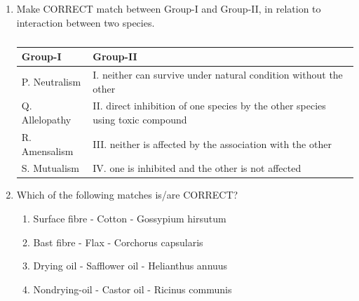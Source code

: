 \documentclass[journal,12pt,onecolumn]{IEEEtran}
\theoremstyle{remark}
\begin{document}
\begin{enumerate}
    \item Make CORRECT match between Group-I and Group-II, in relation to interaction between two species.

    \hfill{}

    \begin{table}[h!]
    \centering
    \caption*{}
    \label{tab:q61}
    \begin{tabular}{ll}
    \hline
    \textbf{Group-I} & \textbf{Group-II} \\
    \hline
    P. Neutralism & I. neither can survive under natural condition without the other \\
    Q. Allelopathy & II. direct inhibition of one species by the other species using toxic compound \\
    R. Amensalism & III. neither is affected by the association with the other \\
    S. Mutualism & IV. one is inhibited and the other is not affected \\
    \hline
    \end{tabular}
    \end{table}

    \begin{enumerate}
    \end{enumerate}

    \item Which of the following matches is/are CORRECT?

    \hfill{}

    \begin{enumerate}
        \item Surface fibre - Cotton - Gossypium hirsutum
        \item Bast fibre - Flax - Corchorus capsularis
        \item Drying oil - Safflower oil - Helianthus annuus
        \item Nondrying-oil - Castor oil - Ricinus communis
    \end{enumerate}


\end{enumerate}
\end{document}
